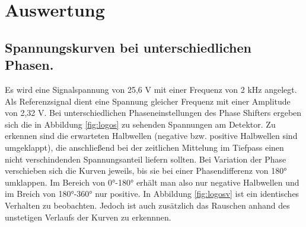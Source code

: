 \section{Auswertung}
\label{sec:Auswertung}

\subsection{Spannungskurven bei unterschiedlichen Phasen.}
Es wird eine Signalspannung von 25,6 V mit einer Frequenz von 2 kHz angelegt. Als
Referenzsignal dient eine Spannung gleicher Frequenz mit einer Amplitude von
2,32 V.
Bei unterschiedlichen Phaseneinstellungen des Phase Shifters ergeben sich
die in Abbildung \ref{fig:logos} zu sehenden Spannungen am Detektor.
Zu erkennen sind die erwarteten Halbwellen (negative bzw. positive Halbwellen sind umgeklappt),
die anschließend bei der zeitlichen Mittelung im Tiefpass einen nicht verschindenden
Spannungsanteil liefern sollten.
Bei Variation der Phase verschieben sich die Kurven jeweils,
bis sie bei einer Phasendifferenz von 180° umklappen. Im Bereich von 0°-180° erhält
man also nur negative Halbwellen und im Breich von 180°-360° nur positive.
In Abbildung \ref{fig:logosv} ist ein identisches Verhalten zu beobachten.
Jedoch ist auch zusätzlich das Rauschen anhand des unstetigen Verlaufs der Kurven zu
erkennnen.

